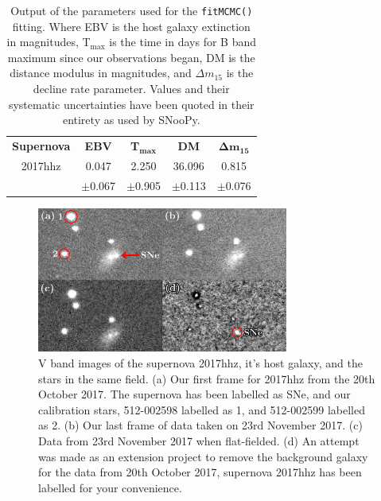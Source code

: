 \documentclass[twocolumn]{revtex4}
\begin{document}
\begin{table}[h!]
\centering
\begin{tabular}{c@{\hskip 15pt}c@{\hskip 15pt}c@{\hskip 15pt}c@{\hskip 15pt}c} 
 \hline
 \textbf{Supernova} & \textbf{EBV} & \textbf{T$_{\boldsymbol{\max}}$} & \textbf{DM} & \textbf{$\boldsymbol{\Delta m_{15}}$} \\ [0.5ex] 
 2017hhz & 0.047 & 2.250 &  36.096 & 0.815 \\
  & $\pm$0.067 & $\pm$0.905 & $\pm$0.113 & $\pm$0.076 \\
 \hline
\end{tabular}
\caption{Output of the parameters used for the \texttt{fitMCMC()} fitting. Where EBV is the host galaxy extinction in magnitudes, T$_{\max}$ is the time in days for B band maximum since our observations began, DM is the distance modulus in magnitudes, and $\Delta m_{15}$ is the decline rate parameter. Values and their systematic uncertainties have been quoted in their entirety as used by SNooPy. }
\label{table:snpy_mcmc_summary}
\end{table}

\begin{figure}[!h]
\begin{center}
\includegraphics[width=8.25cm]{images/collage_rectangle_small}
\caption[]{V band images of the supernova 2017hhz, it's host galaxy, and the stars in the same field. (a) Our first frame for 2017hhz from the 20th October 2017. The supernova has been labelled as SNe, and our calibration stars, 512-002598 labelled as 1, and 512-002599 labelled as 2. (b) Our last frame of data taken on 23rd November 2017. (c) Data from 23rd November 2017 when flat-fielded. (d) An attempt was made as an extension project to remove the background galaxy for the data from 20th October 2017, supernova 2017hhz has been labelled for your convenience.}
\label{fig:2017hhz_collage}
\vspace{-6ex}
\end{center}
\end{figure}
\end{document}
